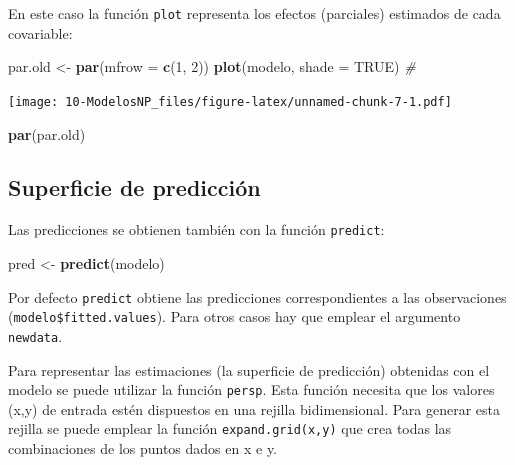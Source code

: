 \documentclass[]{book}
\newenvironment{Shaded}{\begin{snugshade}}{\end{snugshade}}
\newcommand{\CommentTok}[1]{\textcolor[rgb]{0.56,0.35,0.01}{\textit{#1}}}
\newcommand{\DataTypeTok}[1]{\textcolor[rgb]{0.13,0.29,0.53}{#1}}
\newcommand{\DecValTok}[1]{\textcolor[rgb]{0.00,0.00,0.81}{#1}}
\newcommand{\KeywordTok}[1]{\textcolor[rgb]{0.13,0.29,0.53}{\textbf{#1}}}
\newcommand{\NormalTok}[1]{#1}
\newcommand{\OtherTok}[1]{\textcolor[rgb]{0.56,0.35,0.01}{#1}}
\newcommand{\StringTok}[1]{\textcolor[rgb]{0.31,0.60,0.02}{#1}}
\begin{document}
En este caso la función \texttt{plot} representa los efectos (parciales) estimados de cada covariable:

\begin{Shaded}
\begin{Highlighting}[]
\NormalTok{par.old <-}\StringTok{ }\KeywordTok{par}\NormalTok{(}\DataTypeTok{mfrow =} \KeywordTok{c}\NormalTok{(}\DecValTok{1}\NormalTok{, }\DecValTok{2}\NormalTok{))}
\KeywordTok{plot}\NormalTok{(modelo, }\DataTypeTok{shade =} \OtherTok{TRUE}\NormalTok{) }\CommentTok{# }
\end{Highlighting}
\end{Shaded}

\texttt{[image: 10-ModelosNP\_files/figure-latex/unnamed-chunk-7-1.pdf]}

\begin{Shaded}
\begin{Highlighting}[]
\KeywordTok{par}\NormalTok{(par.old)}
\end{Highlighting}
\end{Shaded}

\hypertarget{superficie-de-prediccion}{%
\subsection{Superficie de predicción}\label{superficie-de-prediccion}}

Las predicciones se obtienen también con la función \texttt{predict}:

\begin{Shaded}
\begin{Highlighting}[]
\NormalTok{pred <-}\StringTok{ }\KeywordTok{predict}\NormalTok{(modelo)}
\end{Highlighting}
\end{Shaded}

Por defecto \texttt{predict} obtiene las predicciones correspondientes a las observaciones (\texttt{modelo\$fitted.values}). Para otros casos hay que emplear el argumento \texttt{newdata}.

Para representar las estimaciones (la superficie de predicción) obtenidas con el modelo se puede
utilizar la función \texttt{persp}. Esta función necesita que los valores (x,y) de entrada estén
dispuestos en una rejilla bidimensional. Para generar esta rejilla se puede emplear la función \texttt{expand.grid(x,y)} que crea todas las combinaciones de los puntos dados en x e y.
\end{document}
